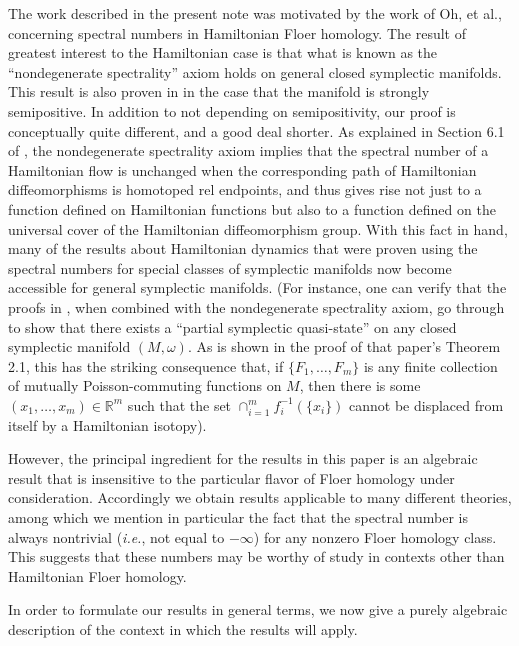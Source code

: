 \documentclass{amsart}
\theoremstyle{plain}
\theoremstyle{definition}
\theoremstyle{remark}
\begin{document}
The work described in the present note was motivated by the work of Oh, et al., concerning spectral numbers in Hamiltonian Floer homology.  The result of greatest interest to the Hamiltonian case is that what is known as the ``nondegenerate spectrality'' axiom holds on general closed symplectic manifolds.  This result  is also proven in  \cite{Oh3} in the case that the manifold is strongly semipositive.  In addition to not depending on semipositivity, our proof is conceptually quite different, and a good deal shorter.  As explained in Section 6.1 of \cite{Oh},  the nondegenerate spectrality axiom implies that the spectral number of a Hamiltonian flow is unchanged when the corresponding path of Hamiltonian diffeomorphisms is homotoped rel endpoints, and thus gives rise not just to a function defined on Hamiltonian functions but also to a function defined on the universal cover of the Hamiltonian diffeomorphism group.  With this fact in hand, many of the results about Hamiltonian dynamics that were proven using the spectral numbers for special classes of symplectic manifolds now become accessible for general symplectic manifolds.  (For instance, one can verify that the proofs in \cite{EP}, when combined with the nondegenerate spectrality axiom, go through to show that there exists a ``partial symplectic quasi-state'' on any closed symplectic manifold $(M,\omega)$.  As is shown in the proof of that paper's Theorem 2.1, this has the striking consequence that, if $\{F_1,\ldots,F_m\}$ is any finite collection of mutually Poisson-commuting functions on $M$, then there is some $(x_1,\ldots,x_m)\in\mathbb{R}^{m}$ such that the set $\cap_{i=1}^{m}f_{i}^{-1}(\{x_i\})$ cannot be displaced from itself by a Hamiltonian isotopy). 

However, the principal ingredient for the results in this paper is an algebraic result that is insensitive to the particular flavor of Floer homology under consideration.  Accordingly we obtain results applicable to many different theories, among which we mention in particular the fact that the spectral number is always nontrivial (\emph{i.e.}, not equal to $-\infty$) for any nonzero Floer homology class.  This suggests that these numbers may be worthy of study in contexts other than Hamiltonian Floer homology.  

In order to formulate our results in general terms, we now give a purely algebraic description of the context in which the results will apply.
\end{document}

